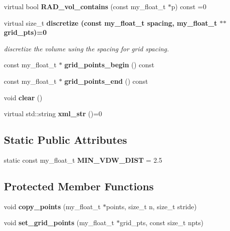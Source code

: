 \begin{CompactItemize}
\item 
virtual bool \textbf{RAD\_\-vol\_\-contains} (const my\_\-float\_\-t $\ast$p) const =0\label{classASCbase_1_1BoundingVolume_c7aa46af4a8298a435da9b8f04c6640f}

\item 
virtual size\_\-t \bf{discretize} (const my\_\-float\_\-t spacing, my\_\-float\_\-t $\ast$$\ast$grid\_\-pts)=0\label{classASCbase_1_1BoundingVolume_3e29c82e9883e18e948de572c28f778e}

\begin{CompactList}\small\item\em discretize the volume using the spacing for grid spacing. \item\end{CompactList}\item 
const my\_\-float\_\-t $\ast$ \textbf{grid\_\-points\_\-begin} () const \label{classASCbase_1_1BoundingVolume_6bbd9d6cfc903cc3684e9a8d4b6c4609}

\item 
const my\_\-float\_\-t $\ast$ \textbf{grid\_\-points\_\-end} () const \label{classASCbase_1_1BoundingVolume_bcd2ff2e80f5bdbd3838a589672caa92}

\item 
void \textbf{clear} ()\label{classASCbase_1_1BoundingVolume_238de4a44b0b1fd68bd3379f5abdb02c}

\item 
virtual std::string \textbf{xml\_\-str} ()=0\label{classASCbase_1_1BoundingVolume_edfa3d6c9da7269a8cc3b3361e1fce4b}

\end{CompactItemize}
\subsection*{Static Public Attributes}
\begin{CompactItemize}
\item 
static const my\_\-float\_\-t \textbf{MIN\_\-VDW\_\-DIST} = 2.5\label{classASCbase_1_1BoundingVolume_16eb8d31fe37eb14bf9b18f571cd32ad}

\end{CompactItemize}
\subsection*{Protected Member Functions}
\begin{CompactItemize}
\item 
void \textbf{copy\_\-points} (my\_\-float\_\-t $\ast$points, size\_\-t n, size\_\-t stride)\label{classASCbase_1_1BoundingVolume_276a47b97596ef8062112b0399e3c27c}

\item 
void \textbf{set\_\-grid\_\-points} (my\_\-float\_\-t $\ast$grid\_\-pts, const size\_\-t npts)\label{classASCbase_1_1BoundingVolume_9955a12346fe57b4a1a9bcc116a14c67}

\end{CompactItemize}
